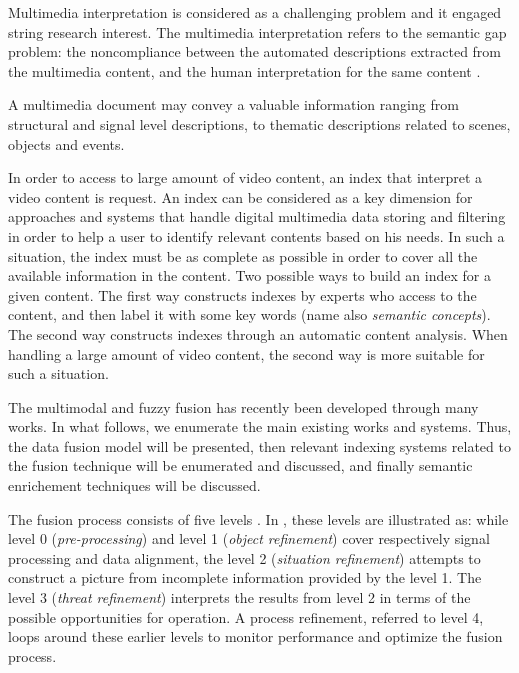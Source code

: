 	Multimedia interpretation is considered as a challenging problem and it engaged string research interest. 
	The multimedia interpretation refers to the semantic gap problem: the noncompliance between the
	automated descriptions extracted from the multimedia content, and the human interpretation for the 
	same content \citep{Smeulders2000}.
	
	A multimedia document may convey a valuable information ranging from structural and signal level descriptions, 
	to thematic descriptions related to scenes, objects and events. 

	In order to access to large amount of video content, an index that interpret a video content 
	is request. An index can be considered as a key dimension for approaches and systems that handle 
	digital multimedia data storing and filtering in order to help a user to identify relevant contents 
	based on his needs. In such a situation, the index must be as complete as possible in order to cover 
	all the available information in the content. Two possible ways to build an index for a given content. 
	The first way  constructs indexes by experts who access to the content, and then label it with some 
	key words (name also \textit{semantic concepts}). The second way constructs indexes through
	an automatic content analysis. When handling a large amount of video content, the second way is 
	more suitable for such a situation.


	The multimodal and fuzzy fusion has recently been developed through many works. In what follows, 
	we enumerate the main existing works and systems. Thus, the data fusion model will be presented, 
	then relevant indexing systems related to the fusion technique will be enumerated and discussed, 
	and finally semantic enrichement techniques will be discussed.

	The fusion process consists of five levels \citep{Waltz1990a,Esteban2005a,Guerrero2009a}. 
	In \citep{Blasch2006a}, these levels are illustrated as: while level 0 (\emph{pre-processing}) 
	and level 1 (\emph{object refinement}) cover respectively signal processing and data alignment, 
	the level 2 (\emph{situation refinement}) attempts to construct a picture from incomplete 
	information provided by the level 1. The level 3 (\emph{threat refinement}) interprets the 
	results from level 2 in terms of the possible opportunities for operation. A process refinement, 
	referred to level 4, loops around these earlier levels to monitor performance and optimize the fusion process.

